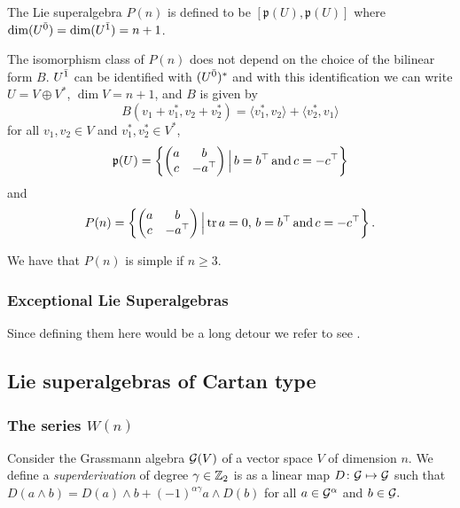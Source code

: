 The Lie superalgebra $P(n)$ is defined to be $[\mathfrak{p}(U),\mathfrak{p}(U)]$ where $\operatorname{dim} (U^{\bar0}) =\operatorname{dim} (U^{\bar1})=n+1$.

The isomorphism class of $P(n)$ does not depend on the choice of the bilinear form $B$. %
$U^{\bar1}$ can be identified with $(U^{\bar0})^*$ and with this identification we can write $U=V\oplus V^*$, $\operatorname{dim} V = n+1$, and $B$ is given by
\[B(v_1+v^*_1,v_2 + v_2^*) = \langle v_1^*, v_2\rangle + \langle v_2^*, v_1\rangle\] for all $v_1, v_2\in V$ and $v_1^*, v_2^*\in V^*$,%
%
%
\[\mathfrak{p}(U) = \left\{\left(\begin{matrix}
    					a  &  b        \\
   					    c  &  -a^{\top}\\ 
 \end{matrix}
 \right) \Big| \, b=b^{\top} \,\text{and}\, c=-c^{\top}\right\}\]
% 
and
% 
\[P(n) = \left\{\left(\begin{matrix}
    					a  &  b        \\
   					    c  &  -a^{\top}\\ 
 \end{matrix}
 \right)\Big| \operatorname{tr} a = 0,\, b=b^{\top} \,\text{and}\, c=-c^{\top}\right\}.\]
 
 We have that $P(n)$ is simple if $n\geq 3$.

\subsubsection{Exceptional Lie Superalgebras} Since defining them here would be a long detour we refer to see \cite{artigokac}.

\subsection{Lie superalgebras of Cartan type}



\subsubsection{The series $W(n)$}
Consider the Grassmann algebra $\mathcal G(V)$ of a vector space $V$ of dimension $n$. We define a \emph{superderivation} of degree $\gamma\in\mathbb{Z}_{2}$ is as a linear map $D\colon \mathcal G \mapsto \mathcal G$ such that $D (a\wedge b)= D (a)\wedge b + (-1)^{\alpha\gamma} a\wedge D (b)$ for all $a \in \mathcal G^{\alpha}$ and $b\in \mathcal G.$

